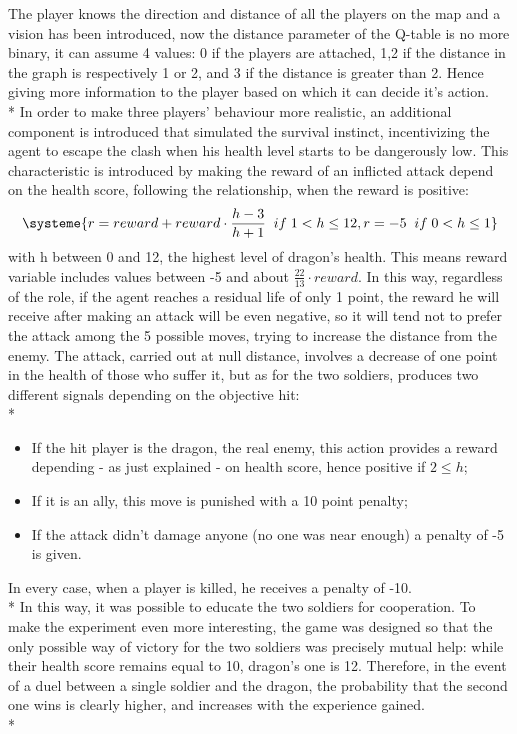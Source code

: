 The player knows the direction and distance of all the players on the map and a vision has been introduced, now the distance parameter of the Q-table is no more binary, it can assume 4 values: 0 if the players are attached, 1,2 if the distance in the graph is respectively 1 or 2, and 3 if the distance is greater than 2. Hence giving more information to the player based on which it can decide it's action.\\*
In order to make three players' behaviour more realistic, an additional component is introduced that simulated the survival instinct, incentivizing the agent to escape the clash when his health level starts to be dangerously low. This characteristic is introduced by making the reward of an inflicted attack depend on the health score, following the relationship, when the reward is positive:
\[
\systeme{r = reward+reward\cdot\frac{h-3}{h+1}\;\;if\;1<h\leq 12, r = -5\;\;if\;0<h\leq 1}
\]
with h between 0 and 12, the highest level of dragon's health. This means reward variable includes values between -5 and about $\frac{22}{13}\cdot reward$. In this way, regardless of the role, if the agent reaches a residual life of only 1 point, the reward he will receive after making an attack will be even negative, so it will tend not to prefer the attack among the 5 possible moves, trying to increase the distance from the enemy. The attack, carried out at null distance, involves a decrease of one point in the health of those who suffer it, but as for the two soldiers, produces two different signals depending on the objective hit:\\*
\begin{itemize}[noitemsep, topsep=0ex]
  \item If the hit player is the dragon, the real enemy, this action provides a reward depending - as just explained - on health score, hence positive if $2\leq h$;
  \item If it is an ally, this move is punished with a 10 point penalty;
  \item If the attack didn't damage anyone (no one was near enough) a penalty of -5 is given.
\end{itemize}
In every case, when a player is killed, he receives a penalty of -10.\\*
In this way, it was possible to educate the two soldiers for cooperation. To make the experiment even more interesting, the game was designed so that the only possible way of victory for the two soldiers was precisely mutual help: while their health score remains equal to 10, dragon's one is 12. Therefore, in the event of a duel between a single soldier and the dragon, the probability that the second one wins is clearly higher, and increases with the experience gained.\\*
